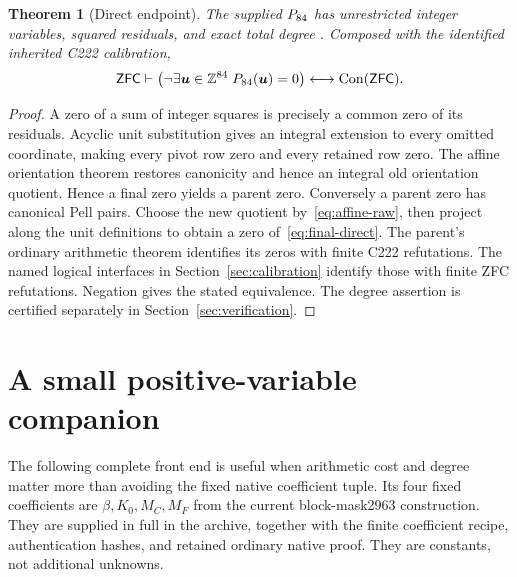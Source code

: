 \documentclass[11pt,letterpaper]{article}
\newtheorem{theorem}{Theorem}[section]
\theoremstyle{definition}\newtheorem{definition}[theorem]{Definition}
\theoremstyle{remark}\newtheorem{remark}[theorem]{Remark}
\newcommand{\Z}{\mathbb Z}\newcommand{\N}{\mathbb N}\newcommand{\Pos}{\mathbb Z_{>0}}
\newcommand{\Con}{\operatorname{Con}}\newcommand{\ZFC}{\mathsf{ZFC}}
\begin{document}
\begin{theorem}[Direct endpoint]\label{thm:direct}
The supplied $P_{84}$ has \DirectVars{} unrestricted integer variables, \DirectRows{} squared residuals, and exact total degree \DirectDegree{}. Composed with the identified inherited C222 calibration,
\[
\ZFC\vdash\left(\neg\exists\boldsymbol u\in\Z^{\DirectVars}\;
P_{\DirectVars}(\boldsymbol u)=0\right)\longleftrightarrow\Con(\ZFC).
\]
\end{theorem}
\begin{proof}
A zero of a sum of integer squares is precisely a common zero of its residuals. Acyclic unit substitution gives an integral extension to every omitted coordinate, making every pivot row zero and every retained row zero. The affine orientation theorem restores canonicity and hence an integral old orientation quotient. Hence a final zero yields a parent zero. Conversely a parent zero has canonical Pell pairs. Choose the new quotient by~\eqref{eq:affine-raw}, then project along the unit definitions to obtain a zero of~\eqref{eq:final-direct}. The parent's ordinary arithmetic theorem identifies its zeros with finite C222 refutations. The named logical interfaces in Section~\ref{sec:calibration} identify those with finite ZFC refutations. Negation gives the stated equivalence. The degree assertion is certified separately in Section~\ref{sec:verification}.
\end{proof}

\section{A small positive-variable companion}\label{sec:native}
The following complete front end is useful when arithmetic cost and degree matter more than avoiding the fixed native coefficient tuple. Its four fixed coefficients are $\beta,K_0,M_C,M_F$ from the current block-mask2963 construction. They are supplied in full in the archive, together with the finite coefficient recipe, authentication hashes, and retained ordinary native proof. They are constants, not additional unknowns.
\end{document}

